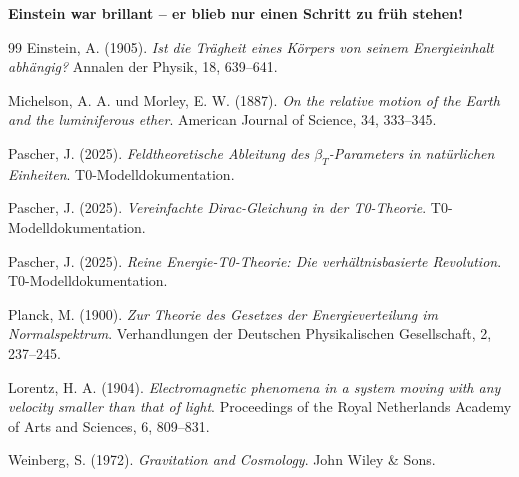 	\textbf{Einstein war brillant – er blieb nur einen Schritt zu früh stehen!}
	\begin{thebibliography}{99}
		Einstein, A. (1905). \textit{Ist die Trägheit eines Körpers von seinem Energieinhalt abhängig?} Annalen der Physik, 18, 639--641.
		
		Michelson, A. A. und Morley, E. W. (1887). \textit{On the relative motion of the Earth and the luminiferous ether}. American Journal of Science, 34, 333--345.
		
		Pascher, J. (2025). \textit{Feldtheoretische Ableitung des $\beta_T$-Parameters in natürlichen Einheiten}. T0-Modelldokumentation.
		
		Pascher, J. (2025). \textit{Vereinfachte Dirac-Gleichung in der T0-Theorie}. T0-Modelldokumentation.
		
		Pascher, J. (2025). \textit{Reine Energie-T0-Theorie: Die verhältnisbasierte Revolution}. T0-Modelldokumentation.
		
		Planck, M. (1900). \textit{Zur Theorie des Gesetzes der Energieverteilung im Normalspektrum}. Verhandlungen der Deutschen Physikalischen Gesellschaft, 2, 237--245.
		
		Lorentz, H. A. (1904). \textit{Electromagnetic phenomena in a system moving with any velocity smaller than that of light}. Proceedings of the Royal Netherlands Academy of Arts and Sciences, 6, 809--831.
		
		Weinberg, S. (1972). \textit{Gravitation and Cosmology}. John Wiley \& Sons.
	\end{thebibliography}
